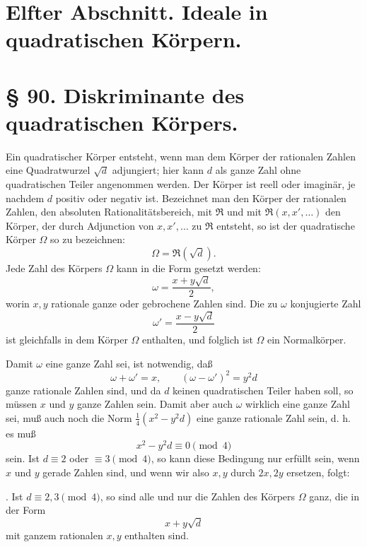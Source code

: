 \documentclass[11pt]{article}
\begin{document}
\section*{Elfter Abschnitt. Ideale in quadratischen Körpern.}

\section*{§ 90. Diskriminante des quadratischen Körpers.}

Ein quadratischer Körper entsteht, wenn man dem Körper der rationalen Zahlen eine Quadratwurzel $\sqrt d$ adjungiert; hier kann $d$ als ganze Zahl ohne quadratischen Teiler angenommen werden. Der Körper ist reell oder imaginär, je nachdem $d$ positiv oder negativ ist. Bezeichnet man den Körper der rationalen Zahlen, den absoluten Rationalitätsbereich, mit $\mathfrak R$ und mit $\mathfrak R(x,x',\ldots)$ den Körper, der durch Adjunction von $x,x',\ldots$ zu $\mathfrak R$ entsteht, so ist der quadratische Körper $\Omega$ so zu bezeichnen:
\begin{equation}
 \Omega=\mathfrak R(\sqrt d).
\tag{1}
\end{equation}
Jede Zahl des Körpers $\Omega$ kann in die Form gesetzt werden:
\begin{equation}
 \omega=\frac{x+y\sqrt d}{2},
\tag{2}
\end{equation}
worin $x,y$ rationale ganze oder gebrochene Zahlen sind. Die zu $\omega$ konjugierte Zahl
\begin{equation}
 \omega'=\frac{x-y\sqrt d}{2}
\tag{3}
\end{equation}
ist gleichfalls in dem Körper $\Omega$ enthalten, und folglich ist $\Omega$ ein Normalkörper.

Damit $\omega$ eine ganze Zahl sei, ist notwendig, daß
\[
 \omega+\omega'=x,
 \qquad (\omega-\omega')^2=y^2d
\]
ganze rationale Zahlen sind, und da $d$ keinen quadratischen Teiler haben soll, so müssen $x$ und $y$ ganze Zahlen sein. Damit aber auch $\omega$ wirklich eine ganze Zahl sei, muß auch noch die Norm $\frac14(x^2-y^2d)$ eine ganze rationale Zahl sein, d. h. es muß
\begin{equation}
 x^2-y^2d\equiv 0\pmod 4
\tag{4}
\end{equation}
sein. Ist $d\equiv2$ oder $\equiv3\pmod4$, so kann diese Bedingung nur erfüllt sein, wenn $x$ und $y$ gerade Zahlen sind, und wenn wir also $x,y$ durch $2x,2y$ ersetzen, folgt:

\medskip
{}. Ist $d\equiv2,3\pmod4$, so sind alle und nur die Zahlen des Körpers $\Omega$ ganz, die in der Form
\[
 x+y\sqrt d
\]
mit ganzem rationalen $x,y$ enthalten sind.
\medskip
\end{document}
